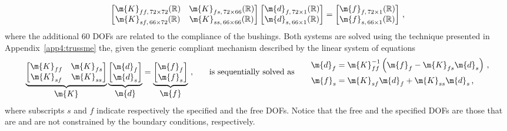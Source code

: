 \begin{equation}
  \begin{bmatrix}
    \m{K}_{ff ,\, 72 \times 72}(\mathbb{R}) & \m{K}_{fs ,\, 72 \times 66}(\mathbb{R}) \\
    \m{K}_{sf ,\, 66 \times 72}(\mathbb{R}) & \m{K}_{ss ,\, 66 \times 66}(\mathbb{R})
  \end{bmatrix} \begin{bmatrix}
    \m{d}_{f ,\, 72 \times 1}(\mathbb{R}) \\ \m{d}_{s ,\, 66 \times 1}(\mathbb{R})
  \end{bmatrix} = \begin{bmatrix}
    \m{f}_{f ,\, 72 \times 1}(\mathbb{R}) \\ \m{f}_{s ,\, 66 \times 1}(\mathbb{R})
  \end{bmatrix}
  \, \text{,}
\end{equation}
%
where the additional 60 \acp{DOF} are related to the compliance of the bushings. Both systems are solved using the technique presented in Appendix~\ref{app4:trussme} the, given the generic compliant mechanism described by the linear system of equations
%
\begin{equation}
  \label{chap4:eq:macrofe}
  \underbrace{\begin{bmatrix}
    \m{K}_{ff} & \m{K}_{fs} \\
    \m{K}_{sf} & \m{K}_{ss}
  \end{bmatrix}}_{\textstyle\m{K}} \underbrace{\begin{bmatrix}
    \m{d}_{f} \\ \m{d}_{s}
  \end{bmatrix}}_{\textstyle\m{d}} = \underbrace{\begin{bmatrix}
    \m{f}_{f} \\ \m{f}_{s}
  \end{bmatrix}}_{\textstyle\m{f}} \, \text{,}
  \qquad \text{is sequentially solved as} \qquad
  \begin{aligned}
    \m{d}_{f} &= \m{K}_{ff}^{-1}\left(\m{f}_{f} - \m{K}_{fs}\m{d}_{s}\right) \, \text{,} \\
    \m{f}_{s} &= \m{K}_{sf}\m{d}_{f} + \m{K}_{ss}\m{d}_{s} \, \text{,}
  \end{aligned}
\end{equation}
%
where subscripts $s$ and $f$ indicate respectively the specified and the free \acp{DOF}. Notice that the free and the specified \acp{DOF} are those that are and are not constrained by the boundary conditions, respectively.

